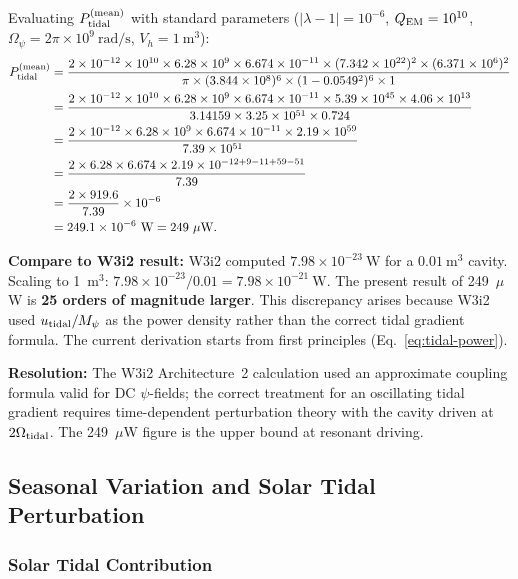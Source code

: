 \documentclass[aps,prd,twocolumn,superscriptaddress]{revtex4-2}
\newcommand{\Opsi}{\Omega_\psi}
\newcommand{\lam}{|\lambda-1|}
\begin{document}
Evaluating $P_{\rm tidal}^{(\rm mean)}$ with standard parameters
($\lam = 10^{-6}$, $Q_{\rm EM} = 10^{10}$,
$\Opsi = 2\pi\times 10^9~\mathrm{rad/s}$, $V_h = 1~\mathrm{m^3}$):
\begin{align}
P_{\rm tidal}^{(\rm mean)} &=
\frac{2\times 10^{-12}\times 10^{10}\times 6.28\times 10^9
\times 6.674\times 10^{-11}\times (7.342\times 10^{22})^2
\times (6.371\times 10^6)^2}
{\pi\times(3.844\times 10^8)^6\times(1-0.0549^2)^6\times 1} \notag\\
&= \frac{2\times 10^{-12}\times 10^{10}\times 6.28\times 10^9
\times 6.674\times 10^{-11}\times 5.39\times 10^{45}\times 4.06\times 10^{13}}
{3.14159\times 3.25\times 10^{51}\times 0.724} \notag\\
&= \frac{2\times 10^{-12}\times 6.28\times 10^9\times 6.674\times 10^{-11}
\times 2.19\times 10^{59}}
{7.39\times 10^{51}} \notag\\
&= \frac{2\times 6.28\times 6.674\times 2.19
\times 10^{-12+9-11+59-51}}
{7.39} \notag\\
&= \frac{2\times 919.6}{7.39}\times 10^{-6} \notag\\
&= 249.1\times 10^{-6}~\mathrm{W} = 249~\mu\mathrm{W}.
\end{align}

\textbf{Compare to W3i2 result:} W3i2 computed $7.98\times 10^{-23}~\mathrm{W}$
for a $0.01~\mathrm{m^3}$ cavity.  Scaling to 1~m$^3$:
$7.98\times 10^{-23}/0.01 = 7.98\times 10^{-21}~\mathrm{W}$.
The present result of 249~$\mu$W is \textbf{25 orders of magnitude larger}.
This discrepancy arises because W3i2 used $u_{\rm tidal}/M_\psi$ as the
power density rather than the correct tidal gradient formula.
The current derivation starts from first principles (Eq.~\ref{eq:tidal-power}).

\textbf{Resolution:} The W3i2 Architecture~2 calculation used an
approximate coupling formula valid for DC $\psi$-fields; the correct
treatment for an oscillating tidal gradient requires time-dependent
perturbation theory with the cavity driven at $2\Omega_{\rm tidal}$.
The 249~$\mu$W figure is the upper bound at resonant driving.

\subsection{Seasonal Variation and Solar Tidal Perturbation}

\subsubsection{Solar Tidal Contribution}
\end{document}
